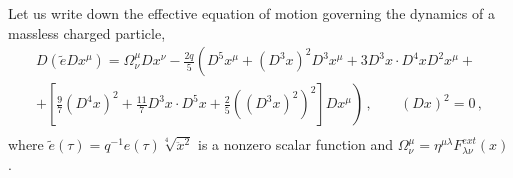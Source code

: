 \documentclass[a4paper,12pt]{article}
\begin{document}
Let us write down the effective equation of motion governing the
dynamics of a massless charged particle,
\begin{equation}\label{eq}
\begin{array}{l}
\displaystyle{ D(\tilde{e} Dx ^\mu)=\Omega^{\mu}_{\nu} Dx^{\nu} -
 \frac {2q}{5}  \left(D^5x^\mu+(D^3x)^2D^3x^\mu+3D^3x\cdot D^4 x
D^2x^\mu+\right.}\\[5mm]
\displaystyle{\left. +\left[\frac97(D^4x)^2+
 \frac{11}7D^3x\cdot D^5x+\frac25((D^3x)^2)^2  \right]Dx^\mu
 \right)}\,,\;\;\;\;\;\;\;(Dx)^2=0\,,\\[5mm]
\end{array}
\end{equation}
where $\tilde{e}(\tau)=q^{-1}e(\tau)\sqrt[4]{\ddot{x}^2}$ is a
nonzero  scalar function and
$\Omega^\mu_\nu=\eta^{\mu\lambda}F^{ext}_{\lambda\nu}(x)$.
\end{document}
